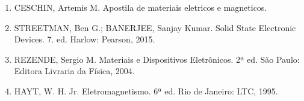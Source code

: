 \documentclass[10pt,twocolumn,letterpaper]{article}
\begin{document}
\small
\begin{enumerate}

    \item CESCHIN, Artemis M. Apostila de materiais eletricos e magneticos.
    
    \item STREETMAN, Ben G.; BANERJEE, Sanjay Kumar. Solid State Electronic Devices. 7. ed. Harlow: Pearson, 2015.
    
    \item REZENDE, Sergio M. Materiais e Dispositivos Eletrônicos. 2ª ed. São Paulo: Editora Livraria da Física, 2004.


    \item HAYT, W. H. Jr. Eletromagnetismo. 6ª ed. Rio de Janeiro: LTC, 1995.
    
\end{enumerate}
\end{document}
